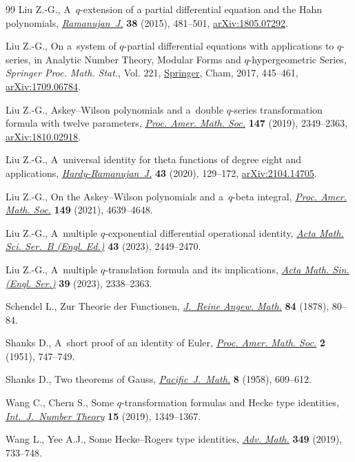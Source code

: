 \documentclass[pdftex]{sigma}
\numberwithin{equation}{section}
\begin{document}
\begin{thebibliography}{99}
Liu Z.-G., A~{$q$}-extension of a partial differential equation and the {H}ahn
 polynomials, \href{https://doi.org/10.1007/s11139-014-9632-1}{\textit{Ramanujan~J.}} \textbf{38} (2015), 481--501,
 \href{https://arxiv.org/abs/1805.07292}{arXiv:1805.07292}.

Liu Z.-G., On a~system of {$q$}-partial differential equations with applications
 to {$q$}-series, in Analytic Number Theory, Modular Forms and
 {$q$}-hypergeometric Series, \textit{Springer Proc. Math. Stat.}, Vol. 221,
 \href{https://doi.org/10.1007/978-3-319-68376-8_2}{Springer}, Cham, 2017, 445--461, \href{https://arxiv.org/abs/1709.06784}{arXiv:1709.06784}.

Liu Z.-G., {A}skey--{W}ilson polynomials and a~double {$q$}-series
 transformation formula with twelve parameters, \href{https://doi.org/10.1090/proc/14411}{\textit{Proc. Amer. Math.
 Soc.}} \textbf{147} (2019), 2349--2363, \href{https://arxiv.org/abs/1810.02918}{arXiv:1810.02918}.

Liu Z.-G., A~universal identity for theta functions of degree eight and
 applications, \href{https://doi.org/10.46298/hrj.2021.7432}{\textit{Hardy-Ramanujan~J.}} \textbf{43} (2020), 129--172,
 \href{https://arxiv.org/abs/2104.14705}{arXiv:2104.14705}.

Liu Z.-G., On the {A}skey--{W}ilson polynomials and a~{$q$}-beta integral,
 \href{https://doi.org/10.1090/proc/15584}{\textit{Proc. Amer. Math. Soc.}} \textbf{149} (2021), 4639--4648.

Liu Z.-G., A~multiple {$q$}-exponential differential operational identity,
 \href{https://doi.org/10.1007/s10473-023-0608-3}{\textit{Acta Math. Sci. Ser.~B (Engl. Ed.)}} \textbf{43} (2023), 2449--2470.

Liu Z.-G., A~multiple {$q$}-translation formula and its implications,
 \href{https://doi.org/10.1007/s10114-023-2237-0}{\textit{Acta Math. Sin. (Engl. Ser.)}} \textbf{39} (2023), 2338--2363.

Schendel L., Zur {T}heorie der {F}unctionen, \href{https://doi.org/10.1515/crelle-1878-18788406}{\textit{J.~Reine Angew. Math.}}
 \textbf{84} (1878), 80--84.

Shanks D., A~short proof of an identity of {E}uler, \href{https://doi.org/10.2307/2032076}{\textit{Proc. Amer. Math.
 Soc.}} \textbf{2} (1951), 747--749.

Shanks D., Two theorems of {G}auss, \href{https://doi.org/10.2140/pjm.1958.8.609}{\textit{Pacific~J.~Math.}} \textbf{8}
 (1958), 609--612.

Wang C., Chern S., Some {$q$}-transformation formulas and {H}ecke type
 identities, \href{https://doi.org/10.1142/S1793042119500751}{\textit{Int.~J.~Number Theory}} \textbf{15} (2019), 1349--1367.

Wang L., Yee A.J., Some {H}ecke--{R}ogers type identities, \href{https://doi.org/10.1016/j.aim.2019.04.015}{\textit{Adv. Math.}}
 \textbf{349} (2019), 733--748.

\end{thebibliography}\LastPageEnding
\end{document}
